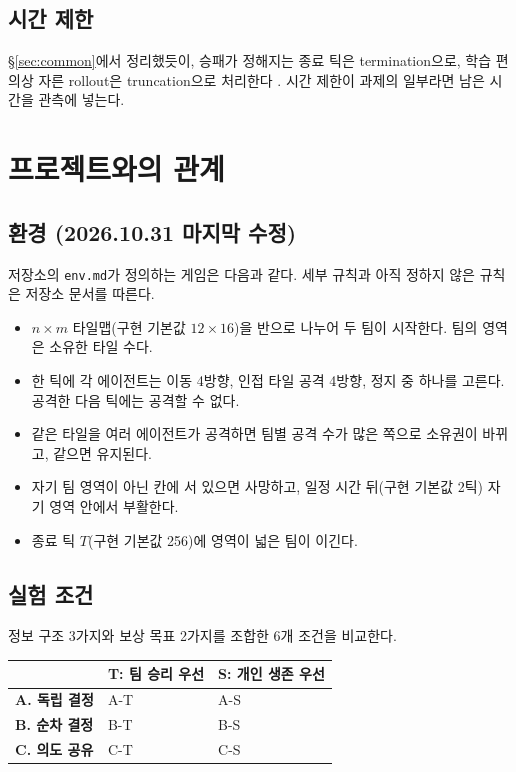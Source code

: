 \documentclass[11pt,a4paper]{article}
\begin{document}
\subsection{시간 제한}
\S\ref{sec:common}에서 정리했듯이, 승패가 정해지는 종료 틱은 termination으로, 학습 편의상 자른 rollout은 truncation으로 처리한다 \cite{timelimits}. 시간 제한이 과제의 일부라면 남은 시간을 관측에 넣는다.

\section{프로젝트와의 관계}\label{sec:project}
\subsection{환경 (2026.10.31 마지막 수정)}
저장소의 \texttt{env.md}가 정의하는 게임은 다음과 같다. 세부 규칙과 아직 정하지 않은 규칙은 저장소 문서를 따른다.
\begin{itemize}
 \item \(n\times m\) 타일맵(구현 기본값 \(12\times16\))을 반으로 나누어 두 팀이 시작한다. 팀의 영역은 소유한 타일 수다.
 \item 한 틱에 각 에이전트는 이동 4방향, 인접 타일 공격 4방향, 정지 중 하나를 고른다. 공격한 다음 틱에는 공격할 수 없다.
 \item 같은 타일을 여러 에이전트가 공격하면 팀별 공격 수가 많은 쪽으로 소유권이 바뀌고, 같으면 유지된다.
 \item 자기 팀 영역이 아닌 칸에 서 있으면 사망하고, 일정 시간 뒤(구현 기본값 2틱) 자기 영역 안에서 부활한다.
 \item 종료 틱 \(T\)(구현 기본값 256)에 영역이 넓은 팀이 이긴다.
\end{itemize}

\subsection{실험 조건}
정보 구조 3가지와 보상 목표 2가지를 조합한 6개 조건을 비교한다.
\begin{center}
\small
\renewcommand{\arraystretch}{1.3}
\begin{tabular}{|p{36mm}|p{46mm}|p{46mm}|}
\hline
 & \textbf{T: 팀 승리 우선} & \textbf{S: 개인 생존 우선}\\ \hline
\textbf{A. 독립 결정} & A-T & A-S\\ \hline
\textbf{B. 순차 결정} & B-T & B-S\\ \hline
\textbf{C. 의도 공유} & C-T & C-S\\ \hline
\end{tabular}
\end{center}
\end{document}

